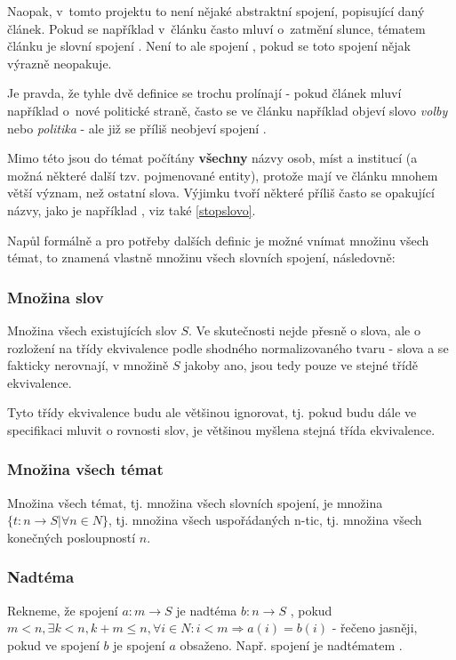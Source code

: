 \documentclass[12pt]{amsart}
\begin{document}
Naopak, v~tomto projektu to není nějaké abstraktní spojení, popisující daný článek. Pokud se například v~článku často mluví o~zatmění slunce, tématem článku je slovní spojení . Není to ale spojení , pokud se toto spojení nějak výrazně neopakuje.

Je pravda, že tyhle dvě definice se trochu prolínají - pokud článek mluví například o~nové politické straně, často se ve článku například objeví slovo \emph{volby} nebo \emph{politika} - ale již se příliš neobjeví spojení \emph{}.

Mimo této  jsou do témat počítány \textbf{všechny} názvy osob, míst a institucí (a možná některé další tzv. pojmenované entity), protože mají ve článku mnohem větší význam, než ostatní slova. Výjimku tvoří některé příliš často se opakující názvy, jako je například \emph{}, viz také \ref{stopslovo}.

Napůl formálně a pro potřeby dalších definic je možné vnímat množinu všech témat, to znamená vlastně množinu všech slovních spojení, následovně:

\subsubsection{Množina slov}
Množina všech existujících slov $S$. Ve skutečnosti nejde přesně o slova, ale o rozložení na třídy ekvivalence podle shodného normalizovaného tvaru - slova  a  se fakticky nerovnají, v množině $S$ jakoby ano, jsou tedy pouze ve stejné třídě ekvivalence. 

Tyto třídy ekvivalence budu ale většinou ignorovat, tj. pokud budu dále ve specifikaci mluvit o rovnosti slov, je většinou myšlena stejná třída ekvivalence. 

\subsubsection{Množina všech témat} Množina všech témat, tj. množina všech slovních spo\-jení, je množina $\{t : n \rightarrow S | \forall n \in N\}$, tj. množina všech uspořádaných n-tic, tj. množina všech konečných posloupností $n$. 

\subsubsection{Nadtéma}
Rekneme, že spojení $a : m \rightarrow S$ je nadtéma $b : n \rightarrow S$ , pokud $m < n, \exists k < n, k + m \le n, \forall i \in  N : i < m \Rightarrow a(i) = b(i)$ - řečeno jasněji, pokud ve spojení $b$ je spojení $a$ obsaženo. Např. spojení \emph{} je nadtématem 
\emph{}. 
\end{document}
